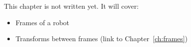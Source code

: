 \label{ch:ros3}
\begin{keyidea}
This chapter is not written yet. It will cover:
\begin{itemize}[nosep]
  \item Frames of a robot
  \item Transforms between frames (link to Chapter~\ref{ch:frames})
\end{itemize}
\end{keyidea}
